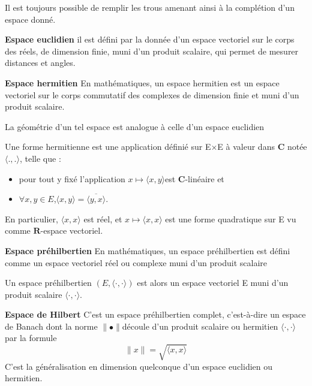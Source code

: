 \documentclass[openany]{book}
\begin{document}
Il est toujours possible de remplir les trous amenant ainsi \`a la compl\'etion d'un espace donn\'e.

\textbf{Espace euclidien}
 il est d\'efini par la donn\'ee d'un espace vectoriel sur le corps des r\'eels, de dimension finie, muni d'un produit scalaire, qui permet de mesurer distances et angles.

\textbf{Espace hermitien}
En math\'ematiques, un espace hermitien est un espace vectoriel sur le corps commutatif des complexes de dimension finie et muni d'un produit scalaire.

La g\'eom\'etrie d'un tel espace est analogue \`a celle d'un espace euclidien

Une forme hermitienne est une application d\'efini\'e sur E×E \`a valeur dans $\mathbf{C}$ not\'ee $\langle .,.\rangle$, telle que :
\begin{itemize}
		\item pour tout y fix\'e l'application $x \mapsto \langle x,y\rangle $est $\mathbf{C}$-lin\'eaire et
		\item $\forall x,y \in E$,$\langle x,y\rangle=\overline{ \langle y,x\rangle}$.
\end{itemize}
En particulier, $\langle x,x\rangle$ est r\'eel, et $x\mapsto \langle x,x\rangle$ est une forme quadratique sur E vu comme $\mathbf{R}$-espace vectoriel.

\textbf{Espace pr\'ehilbertien}
En math\'ematiques, un espace pr\'ehilbertien est d\'efini comme un espace vectoriel r\'eel ou complexe muni d'un produit scalaire

Un espace pr\'ehilbertien $(E,\langle\cdot,\cdot\rangle)$ est alors un espace vectoriel E muni d'un produit scalaire $\langle\cdot,\cdot\rangle$.

\textbf{Espace de Hilbert}
C'est un espace pr\'ehilbertien complet, c'est-\`a-dire un espace de Banach dont la norme $\parallel\bullet\parallel$d\'ecoule d'un produit scalaire ou hermitien $\langle\cdot,\cdot\rangle$ par la formule
 $$\parallel x\parallel = \sqrt{\langle x,x \rangle}$$
C'est la g\'en\'eralisation en dimension quelconque d'un espace euclidien ou hermitien.
\bigskip
\end{document}
